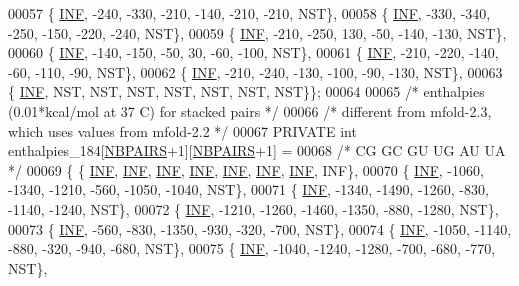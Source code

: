 \begin{DoxyCode}
00057   \{  \hyperlink{energy__const_8h_a12c2040f25d8e3a7b9e1c2024c618cb6}{INF},  -240,  -330,  -210,  -140,  -210,  -210, NST\},
00058   \{  \hyperlink{energy__const_8h_a12c2040f25d8e3a7b9e1c2024c618cb6}{INF},  -330,  -340,  -250,  -150,  -220,  -240, NST\},
00059   \{  \hyperlink{energy__const_8h_a12c2040f25d8e3a7b9e1c2024c618cb6}{INF},  -210,  -250,   130,   -50,  -140,  -130, NST\},
00060   \{  \hyperlink{energy__const_8h_a12c2040f25d8e3a7b9e1c2024c618cb6}{INF},  -140,  -150,   -50,    30,   -60,  -100, NST\},
00061   \{  \hyperlink{energy__const_8h_a12c2040f25d8e3a7b9e1c2024c618cb6}{INF},  -210,  -220,  -140,   -60,  -110,   -90, NST\},
00062   \{  \hyperlink{energy__const_8h_a12c2040f25d8e3a7b9e1c2024c618cb6}{INF},  -210,  -240,  -130,  -100,   -90,  -130, NST\},
00063   \{  \hyperlink{energy__const_8h_a12c2040f25d8e3a7b9e1c2024c618cb6}{INF},   NST,   NST,   NST,   NST,   NST,   NST, NST\}\};
00064 
00065 \textcolor{comment}{/* enthalpies (0.01*kcal/mol at 37 C) for stacked pairs */}
00066 \textcolor{comment}{/* different from mfold-2.3, which uses values from mfold-2.2 */}
00067 PRIVATE \textcolor{keywordtype}{int} enthalpies\_184[\hyperlink{energy__const_8h_a5e75221c779d618eab81e096f37e32ce}{NBPAIRS}+1][\hyperlink{energy__const_8h_a5e75221c779d618eab81e096f37e32ce}{NBPAIRS}+1] =
00068 \textcolor{comment}{/*          CG     GC     GU     UG     AU     UA  */}
00069 \{ \{  \hyperlink{energy__const_8h_a12c2040f25d8e3a7b9e1c2024c618cb6}{INF},   \hyperlink{energy__const_8h_a12c2040f25d8e3a7b9e1c2024c618cb6}{INF},   \hyperlink{energy__const_8h_a12c2040f25d8e3a7b9e1c2024c618cb6}{INF},   \hyperlink{energy__const_8h_a12c2040f25d8e3a7b9e1c2024c618cb6}{INF},   \hyperlink{energy__const_8h_a12c2040f25d8e3a7b9e1c2024c618cb6}{INF},   \hyperlink{energy__const_8h_a12c2040f25d8e3a7b9e1c2024c618cb6}{INF},   \hyperlink{energy__const_8h_a12c2040f25d8e3a7b9e1c2024c618cb6}{INF}, INF\},
00070   \{  \hyperlink{energy__const_8h_a12c2040f25d8e3a7b9e1c2024c618cb6}{INF}, -1060, -1340, -1210,  -560, -1050, -1040, NST\},
00071   \{  \hyperlink{energy__const_8h_a12c2040f25d8e3a7b9e1c2024c618cb6}{INF}, -1340, -1490, -1260,  -830, -1140, -1240, NST\},
00072   \{  \hyperlink{energy__const_8h_a12c2040f25d8e3a7b9e1c2024c618cb6}{INF}, -1210, -1260, -1460, -1350,  -880, -1280, NST\},
00073   \{  \hyperlink{energy__const_8h_a12c2040f25d8e3a7b9e1c2024c618cb6}{INF},  -560,  -830, -1350,  -930,  -320,  -700, NST\},
00074   \{  \hyperlink{energy__const_8h_a12c2040f25d8e3a7b9e1c2024c618cb6}{INF}, -1050, -1140,  -880,  -320,  -940,  -680, NST\},
00075   \{  \hyperlink{energy__const_8h_a12c2040f25d8e3a7b9e1c2024c618cb6}{INF}, -1040, -1240, -1280,  -700,  -680,  -770, NST\},

\end{DoxyCode}
